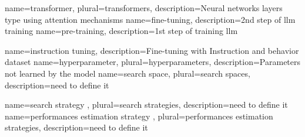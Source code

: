 

{
    name=transformer,
    plural=transformers,
    description={Neural networks layers type using attention mechanisms}
}
{
    name=fine-tuning,
    description={2nd step of \acrshort{llm} training}
}
{
    name=pre-training,
    description={1st step of training \acrshort{llm}}
}

{
    name=instruction tuning,
    description={Fine-tuning with Instruction and behavior dataset}
}
{
    name=hyperparameter,
    plural=hyperparameters,
    description={Parameters not learned by the model}
}
{
    name=search space,
    plural=search spaces,
    description={need to define it}
}

{
    name=search strategy ,
    plural=search strategies,
    description={need to define it}
}
{
    name=performances estimation strategy ,
    plural=performances estimation strategies,
    description={need to define it}
}


